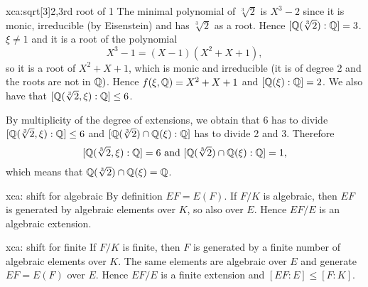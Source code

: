 \begin{sol}{xca:sqrt[3]2,3rd root of 1}
The minimal polynomial of $\sqrt[3]{2}$ is $X^3-2$
since it is monic, irreducible (by Eisenstein) and has $\sqrt[3]{2}$
as a root. Hence $[\mathbb{Q}(\sqrt[3]{2}):\mathbb{Q}]=3$.
$\xi\neq 1$ and it is a root of the polynomial 
\[
X^3-1=(X-1)(X^2+X+1),
\]
so it is a root of $X^2+X+1$, which is monic and
irreducible (it is of degree 2 and the roots are not in $\mathbb{Q})$.
Hence $f(\xi,\mathbb{Q})=X^2+X+1$ and $[\mathbb{Q}(\xi):\mathbb{Q}]=2$.
We also have that $[\mathbb{Q}(\sqrt[3]{2},\xi):\mathbb{Q}]\leq 6$.
    \begin{center}
    \end{center}
By multiplicity of the degree of extensions, we obtain that
6 has to divide $[\mathbb{Q}(\sqrt[3]{2},\xi):\mathbb{Q}]\leq 6$ and
$[\mathbb{Q}(\sqrt[3]{2})\cap\mathbb{Q}(\xi):\mathbb{Q}]$ has to divide 2 and 3.
Therefore 
\[
[\mathbb{Q}(\sqrt[3]{2},\xi):\mathbb{Q}]=6 \text{ and }
[\mathbb{Q}(\sqrt[3]{2})\cap\mathbb{Q}(\xi):\mathbb{Q}]=1,
\]
which means that
$\mathbb{Q}(\sqrt[3]{2})\cap\mathbb{Q}(\xi)=\mathbb{Q}$.
\end{sol}

\begin{sol}{xca: shift for algebraic}
By definition $EF=E(F)$. If $F/K$ is algebraic, then $EF$ is
generated by algebraic elements over $K$, so also over $E$.
Hence $EF/E$ is an algebraic extension.
\end{sol}

\begin{sol}{xca: shift for finite}
If $F/K$ is finite,
then $F$ is generated by a finite number of algebraic elements over $K$.
The same elements are algebraic over $E$ and generate $EF=E(F)$ over $E$.
Hence $EF/E$ is a finite extension and $[EF:E]\leq [F:K]$.
\end{sol}

